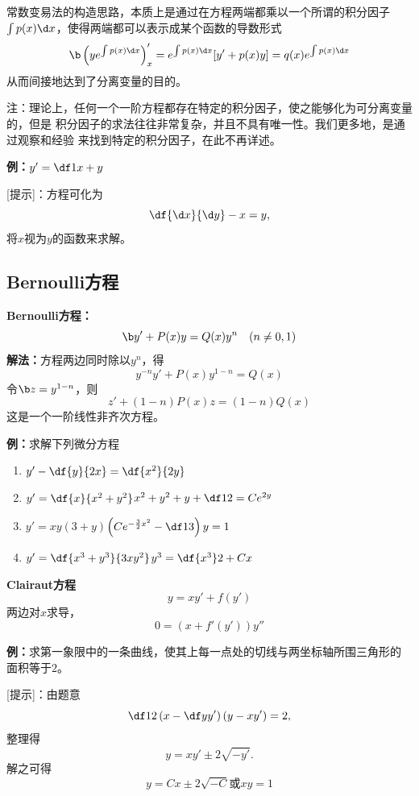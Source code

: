 常数变易法的构造思路，本质上是通过在方程两端都乘以一个所谓的{\kaishu 积分因子}
$\int p(x)\d x$，使得两端都可以表示成某个函数的导数形式
$$\b\left(ye^{\int p(x)\d x}\right)'_x=e^{\int p(x)\d x}[y'+p(x)y]
=q(x)e^{\int p(x)\d x}$$
从而间接地达到了分离变量的目的。

注：理论上，任何一个一阶方程都存在特定的积分因子，使之能够化为可分离变量的，但是
积分因子的求法往往非常复杂，并且不具有唯一性。我们更多地，是通过观察和经验
来找到特定的积分因子，在此不再详述。

{\bf 例：}$y'=\df1{x+y}$

[提示]：方程可化为
$$\df{\d x}{\d y}-x=y,$$
将$x$视为$y$的函数来求解。

\subsection{Bernoulli方程}

\begin{thx}
	{\bf Bernoulli方程：}
	$${\b y'+P(x)y=Q(x)y^n\quad(n\ne 0,1)}$$ 
	{\bf 解法：}方程两边同时除以$y^n$，得
	$$y^{-n}y'+P(x)y^{1-n}=Q(x)$$ 
	令${\b z=y^{1-n}}$，则
	$$z'+(1-n)P(x)z=(1-n)Q(x)$$
	这是一个一阶线性非齐次方程。
\end{thx}

{\bf 例：}求解下列微分方程
\begin{enumerate}[(1)]
  \setlength{\itemindent}{1cm}
  \item $y'-\df{y}{2x}=\df{x^2}{2y}$
  \item $y'=\df{x}{x^2+y^2}$\hfill$x^2+y^2+y+\df12=Ce^{2y}$
  \item $y'=xy(3+y)$\hfill$\left(Ce^{-\frac32x^2}-\df13\right)y=1$
  \item $y'=\df{x^3+y^3}{3xy^2}$\hfill$y^3=\df{x^3}2+Cx$
\end{enumerate}

\begin{shaded}
	{\bf Clairaut方程}
	$$y=xy'+f(y')$$
	两边对$x$求导，
	$$0=(x+f'(y'))y''$$
	
	{\bf 例：}求第一象限中的一条曲线，使其上每一点处的切线与两坐标轴所围三角形的
	面积等于$2$。
	
	[提示]：由题意
	$$\df12\left(x-\df y{y'}\right)(y-xy')=2,$$
	整理得
	$$y=xy'\pm2\sqrt{-y'}.$$
	解之可得
	$$y=Cx\pm2\sqrt{-C}\mbox{或}xy=1$$
\end{shaded}

